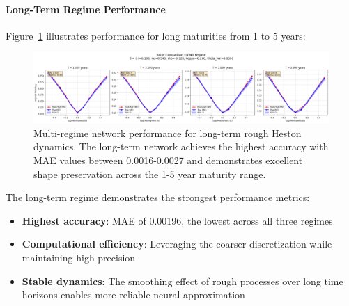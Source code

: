 	\paragraph{Long-Term Regime Performance}
	
	Figure~\ref{fig:multiregime-long} illustrates performance for long maturities from 1 to 5 years:
	
	\begin{figure}[ht]
		\centering
		\includegraphics[width=\textwidth]{../images/smile_comparison_long_regime.png}
		\caption{Multi-regime network performance for long-term rough Heston dynamics. The long-term network achieves the highest accuracy with MAE values between 0.0016-0.0027 and demonstrates excellent shape preservation across the 1-5 year maturity range.}
		\label{fig:multiregime-long}
	\end{figure}
	
	The long-term regime demonstrates the strongest performance metrics:
	
	\begin{itemize}[nosep]
		\item \textbf{Highest accuracy}: MAE of 0.00196, the lowest across all three regimes
		\item \textbf{Computational efficiency}: Leveraging the coarser discretization while maintaining high precision
		\item \textbf{Stable dynamics}: The smoothing effect of rough processes over long time horizons enables more reliable neural approximation
	\end{itemize}
						
%	
%	
	
